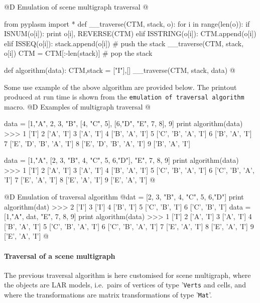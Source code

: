 \documentclass[11pt,oneside]{article}    %
\begin{document}
@D Emulation of scene multigraph traversal
@{from pyplasm import *
def __traverse(CTM, stack, o):
    for i in range(len(o)):
        if ISNUM(o[i]): print o[i], REVERSE(CTM)
        elif ISSTRING(o[i]): 
            CTM.append(o[i])
        elif ISSEQ(o[i]):
            stack.append(o[i])                # push the stack
            __traverse(CTM, stack, o[i])
            CTM = CTM[:-len(stack)]         # pop the stack

def algorithm(data):
    CTM,stack = ["I"],[]
    __traverse(CTM, stack, data)  
@}

Some use example of the above algorithm are provided below. The printout produced at run time is shown from the \texttt{emulation of traversal algorithm} macro.
@D Examples of multigraph traversal
@{data = [1,"A", 2, 3, "B", [4, "C", 5], [6,"D", "E", 7, 8], 9]  
print algorithm(data)
>>> 1 ['I']
    2 ['A', 'I']
    3 ['A', 'I']
    4 ['B', 'A', 'I']
    5 ['C', 'B', 'A', 'I']
    6 ['B', 'A', 'I']
    7 ['E', 'D', 'B', 'A', 'I']
    8 ['E', 'D', 'B', 'A', 'I']
    9 ['B', 'A', 'I']

data = [1,"A", [2, 3, "B", 4, "C", 5, 6,"D"], "E", 7, 8, 9]  
print algorithm(data)
>>> 1 ['I']
    2 ['A', 'I']
    3 ['A', 'I']
    4 ['B', 'A', 'I']
    5 ['C', 'B', 'A', 'I']
    6 ['C', 'B', 'A', 'I']
    7 ['E', 'A', 'I']
    8 ['E', 'A', 'I']
    9 ['E', 'A', 'I']
@}
@D Emulation of traversal algorithm
@{dat = [2, 3, "B", 4, "C", 5, 6,"D"]
print algorithm(dat)
>>> 2 ['I']
    3 ['I']
    4 ['B', 'I']
    5 ['C', 'B', 'I']
    6 ['C', 'B', 'I']
data = [1,"A", dat, "E", 7, 8, 9]
print algorithm(data)
>>> 1 ['I']
    2 ['A', 'I']
    3 ['A', 'I']
    4 ['B', 'A', 'I']
    5 ['C', 'B', 'A', 'I']
    6 ['C', 'B', 'A', 'I']
    7 ['E', 'A', 'I']
    8 ['E', 'A', 'I']
    9 ['E', 'A', 'I']
@}

\paragraph{Traversal of a scene multigraph}

The previous traversal algorithm is here customised for scene multigraph, where the objects are LAR models, i.e.~pairs of vertices of type '\texttt{Verts} and cells, and where the transformations are matrix transformations of type '\texttt{Mat}'.
\end{document}
